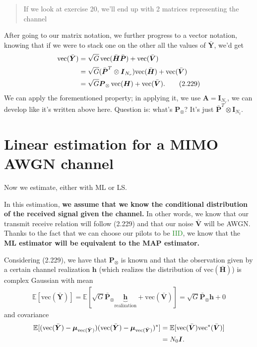 \documentclass[a4paper, 12pt]{book}
\begin{document}
\begin{quote}
    \color{ForestGreen}\vline\hspace{0.5em}\color{black} If we look at exercise 20, we'll end up with 2 matrices representing the channel
\end{quote}

After going to our matrix notation, we further progress to a vector notation, knowing that if we were to stack one on the other all the values of $\bar{\boldsymbol{Y}}$, we'd get
\begin{align}
\text{vec}(\bar{\boldsymbol{Y}}) &= \sqrt{G} \, \text{vec}(\bar{\boldsymbol{H}}\bar{\boldsymbol{P}}) + \text{vec}(\bar{\boldsymbol{V}}) \notag \\
&= \sqrt{G}(\bar{\boldsymbol{P}}^T \otimes \boldsymbol{I}_{N_r})\text{vec}(\bar{\boldsymbol{H}}) + \text{vec}(\bar{\boldsymbol{V}}) \notag \\
&= \sqrt{G}\boldsymbol{P}_{\otimes} \, \text{vec}(\boldsymbol{H}) + \text{vec}(\bar{\boldsymbol{V}}). \tag{2.229}
\end{align}
We can apply the forementioned property; in applying it, we use $\boldsymbol{A} = \boldsymbol{I}_{N_r}$, we can develop like it's written above here.
Question is: what's $\boldsymbol{P}_{\otimes}$? It's just $\bar{\boldsymbol{P}}^T \otimes \boldsymbol{I}_{N_t}$.

\section{Linear estimation for a MIMO AWGN channel}

Now we estimate, either with ML or LS.

In this estimation, \textbf{we assume that we know the conditional distribution of the received signal given the channel.} In other words, we know that our transmit receive relation will follow (2.229) and that our noise $\bar{\boldsymbol{V}}$ will be AWGN.
Thanks to the fact that we can choose our pilots to be \textcolor{ForestGreen}{IID}, we know that the \textbf{ML estimator will be equivalent to the MAP estimator.}

Considering (2.229), we have that $\boldsymbol{P}_{\otimes}$ is known and that the observation given by a certain channel realization $\mathbf{h}$ (which realizes the distribution of $\text{vec}(\bar{\boldsymbol{H}})$) is complex Gaussian with mean
\begin{align}
\mathbb{E}[\text{vec}(\bar{\boldsymbol{Y}})] = \mathbb{E}[\sqrt{G}\bar{\boldsymbol{P}}_{\otimes}\underbrace{\mathbf{h}}_{\text{realization}} + \text{vec}(\bar{\boldsymbol{V}})] = \sqrt{G}\bar{\boldsymbol{P}}_{\otimes}\mathbf{h} + 0
\end{align}
and covariance
\begin{align}
\mathbb{E}[(\text{vec}(\bar{\boldsymbol{Y}}) - \boldsymbol{\mu}_{\text{vec}(\bar{\boldsymbol{Y}})})(\text{vec}(\bar{\boldsymbol{Y}}) - \boldsymbol{\mu}_{\text{vec}(\bar{\boldsymbol{Y}})})^*] &= \mathbb{E}[\text{vec}(\bar{\boldsymbol{V}})\text{vec}^*(\bar{\boldsymbol{V}})] \notag \\
&= N_0 \boldsymbol{I}.
\end{align}
\end{document}
